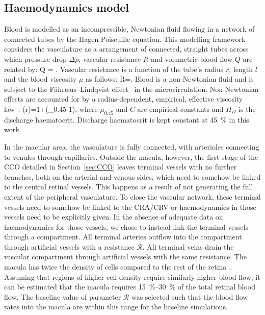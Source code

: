 \documentclass[11pt,]{article}
\let\oldequation\equation
\let\oldendequation\endequation
\renewenvironment{equation}
  {\linenomathNonumbers\oldequation}
  {\oldendequation\endlinenomath}
\begin{document}
\subsection{Haemodynamics model}\label{sec:haemodynamicModel}

Blood is modelled as an incompressible, Newtonian fluid flowing in a
network of connected tubes by the Hagen-Poiseuille equation.
This modelling framework considers the
vasculature as a arrangement of connected, straight tubes across which
pressure drop $\Delta p$, vascular resistance $R$ and volumetric blood
flow $Q$ are related by:
\begin{equation}
  \label{eq:poiseuille}
  Q = .
\end{equation}
Vascular resistance is a function of the tube's radius $r$, length $l$
and the blood viscosity $\mu$ as follows:
\begin{equation}
  \label{eq:resistance}
  R=.  
\end{equation}
Blood is a non-Newtonian fluid and is subject to the
F\r{a}hr\ae us–Lindqvist effect~\cite{Faahraeus1931} in the
microcirculation. 
Non-Newtonian effects are accounted for by a radius-dependent,
empirical, effective viscosity law~\cite{Secomb2013}:
\begin{equation}
  \label{eq:viscosity}
  \mu(r)=1+(\mu_{0.45}-1),
\end{equation}
where $\mu_{0.45}$ and $C$ are empirical constants and $H_D$ is the
discharge haematocrit.
Discharge haematocrit is kept constant at \SI{45}{\percent} in this work.

In the macular area, the vasculature is fully connected, with
arterioles connecting to venules through capillaries.
Outside the macula, however, the first stage of the CCO detailed in
Section~\ref{sec:CCO} leaves terminal vessels with no further branches, both on the arterial and venous sides, which need to somehow be linked to the central retinal vessels.
This happens as a result of not generating the full extent of the peripheral vasculature.
To close the vascular network, these terminal vessels need to somehow be linked to the CRA/CRV or haemodynamics in those vessels need to be explicitly given.
In the absence of adequate data on haemodynamics for those vessels, we chose to instead link the terminal vessels through a compartment.
All terminal arteries outflow into the compartment through artificial vessels with a resistance $\mathcal R$.
All terminal veins drain the vascular compartment through artificial vessels with the same resistance. 
The macula has twice the density of cells compared to the rest of the retina~\cite{Zouache2022}.
Assuming that regions of higher cell density require similarly higher blood flow, it can be estimated that the macula requires \SIrange{15}{30}{\percent} of the total retinal blood flow.
The baseline value of parameter $\mathcal R$ was selected such that the blood flow rates into the macula are within this range for the baseline simulations.
\end{document}
